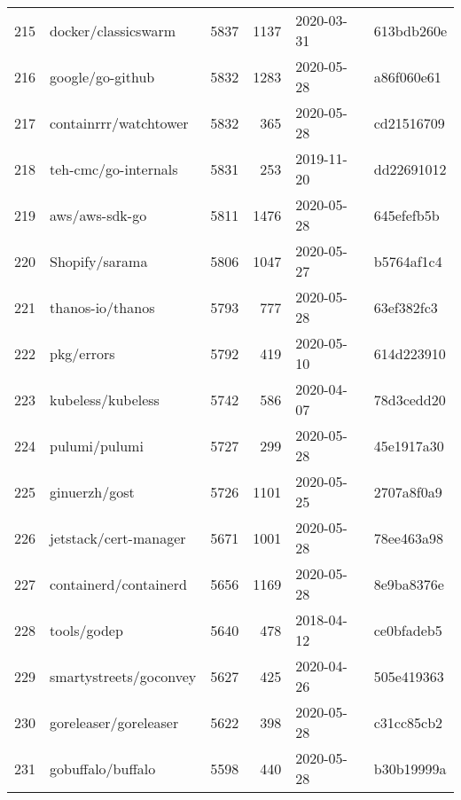 \begin{footnotesize}
\begin{longtable}{llrrll}
        215 &                                docker/classicswarm &   5837 &   1137 & 2020-03-31 &  613bdb260e \\
        216 &                                   google/go-github &   5832 &   1283 & 2020-05-28 &  a86f060e61 \\
        217 &                              containrrr/watchtower &   5832 &    365 & 2020-05-28 &  cd21516709 \\
        218 &                               teh-cmc/go-internals &   5831 &    253 & 2019-11-20 &  dd22691012 \\
        219 &                                     aws/aws-sdk-go &   5811 &   1476 & 2020-05-28 &  645efefb5b \\
        220 &                                     Shopify/sarama &   5806 &   1047 & 2020-05-27 &  b5764af1c4 \\
        221 &                                   thanos-io/thanos &   5793 &    777 & 2020-05-28 &  63ef382fc3 \\
        222 &                                         pkg/errors &   5792 &    419 & 2020-05-10 &  614d223910 \\
        223 &                                  kubeless/kubeless &   5742 &    586 & 2020-04-07 &  78d3cedd20 \\
        224 &                                      pulumi/pulumi &   5727 &    299 & 2020-05-28 &  45e1917a30 \\
        225 &                                      ginuerzh/gost &   5726 &   1101 & 2020-05-25 &  2707a8f0a9 \\
        226 &                              jetstack/cert-manager &   5671 &   1001 & 2020-05-28 &  78ee463a98 \\
        227 &                              containerd/containerd &   5656 &   1169 & 2020-05-28 &  8e9ba8376e \\
        228 &                                        tools/godep &   5640 &    478 & 2018-04-12 &  ce0bfadeb5 \\
        229 &                             smartystreets/goconvey &   5627 &    425 & 2020-04-26 &  505e419363 \\
        230 &                              goreleaser/goreleaser &   5622 &    398 & 2020-05-28 &  c31cc85cb2 \\
        231 &                                  gobuffalo/buffalo &   5598 &    440 & 2020-05-28 &  b30b19999a \\

\end{longtable}
\end{footnotesize}
